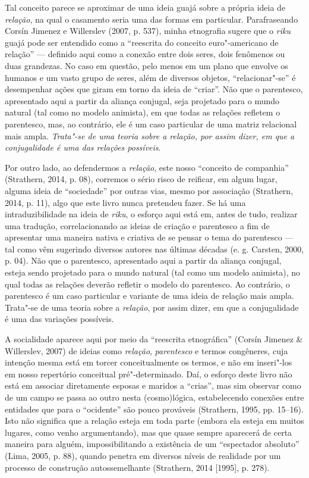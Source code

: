 Tal conceito parece se aproximar de uma ideia guajá sobre a própria
ideia de \emph{relação}, na qual o casamento seria uma das formas em
particular. Parafraseando Corsín Jimenez e Willerslev (2007, p. 537),
minha etnografia sugere que o \emph{riku} guajá pode ser entendido como
a ``reescrita do conceito euro"-americano de relação'' --- definido aqui como
a conexão entre dois seres, dois fenômenos ou duas grandezas. No caso em
questão, pelo menos em um plano que envolve os humanos e um vasto grupo
de seres, além de diversos objetos, ``relacionar"-se'' é desempenhar ações
que giram em torno da ideia de ``criar''. Não que o parentesco,
apresentado aqui a partir da aliança conjugal, seja projetado para o
mundo natural (tal como no modelo animista), em que todas as relações
refletem o parentesco, mas, ao contrário, ele é um caso particular de
uma matriz relacional mais ampla. \emph{Trata"-se de uma teoria sobre a
relação, por assim dizer, em que a conjugalidade é uma das relações
possíveis}.

Por outro lado, ao defendermos a \emph{relação}, este nosso ``conceito
de companhia'' (Strathern, 2014, p. 08), corremos o sério risco de reificar,
em algum lugar, alguma ideia de ``sociedade'' por outras vias, mesmo por
associação (Strathern, 2014, p. 11), algo que este livro nunca pretendeu
fazer. Se há uma intraduzibilidade na ideia de \emph{riku}, o esforço
aqui está em, antes de tudo, realizar uma tradução, correlacionando as
ideias de criação e parentesco a fim de apresentar uma maneira nativa e
criativa de se pensar o tema do parentesco --- tal como vêm sugerindo
diversos autores nas últimas décadas (e. g. Carsten, 2000, p. 04). Não que o
parentesco, apresentado aqui a partir da aliança conjugal, esteja sendo
projetado para o mundo natural (tal como um modelo animista), no qual
todas as relações deverão refletir o modelo do parentesco. Ao contrário,
o parentesco é um caso particular e variante de uma ideia de relação
mais ampla. Trata"-se de uma teoria sobre a \emph{relação}, por assim
dizer, em que a conjugalidade é uma das variações possíveis.

A socialidade aparece aqui por meio da ``reescrita etnográfica'' (Corsín
Jimenez \& Willerslev, 2007) de ideias como \emph{relação},
\emph{parentesco} e termos congêneres, cuja intenção mesma está em
torcer conceitualmente os termos, e não em inseri"-los em nosso
repertório conceitual pré"-determinado. Daí, o esforço deste livro não
está em associar diretamente esposas e maridos a ``crias'', mas sim
observar como de um campo se passa ao outro nesta (cosmo)lógica,
estabelecendo conexões entre entidades que para o ``ocidente'' são pouco
prováveis (Strathern, 1995, pp. 15--16). Isto não significa que a relação
esteja em toda parte (embora ela esteja em muitos lugares, como venho
argumentando), mas que quase sempre aparecerá de certa maneira para
alguém, impossibilitando a existência de um ``espectador absoluto'' (Lima,
2005, p. 88), quando penetra em diversos níveis de realidade por um processo
de construção autossemelhante (Strathern, 2014 {[}1995{]}, p. 278).

